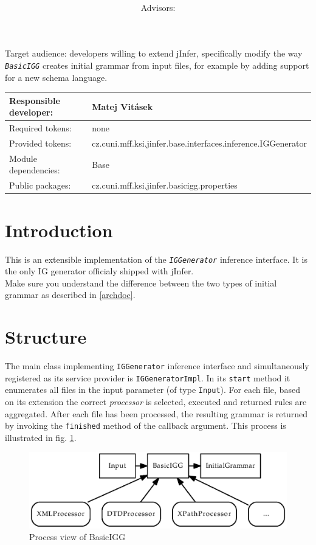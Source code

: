 \documentclass[a4paper,10pt,oneside]{article}
\title{\bf\mftitle}
\author{\mfauthor \\ Advisors: \mfadvisor}
\date{\mfplacedate}
\newcommand{\myscale}{0.74}
\newcommand{\code}[1]{\texttt{#1}}
\newcommand{\jmodule}[1]{\texttt{\textit{#1}}}
\begin{document}
\maketitle
\noindent Target audience: developers willing to extend jInfer, specifically modify the way \jmodule{BasicIGG} creates initial grammar from input files, for example by adding support for a new schema language.

\noindent \begin{tabular}{|l|l|} \hline
Responsible developer: & Matej Vitásek \\ \hline
Required tokens:       & none \\ \hline
Provided tokens:       & cz.cuni.mff.ksi.jinfer.base.interfaces.inference.IGGenerator \\ \hline
Module dependencies:   & Base \\ \hline
Public packages:       & cz.cuni.mff.ksi.jinfer.basicigg.properties \\ \hline
\end{tabular}

\section{Introduction}

This is an extensible implementation of the \jmodule{IGGenerator} inference interface. It is the only IG generator officialy shipped with jInfer.\\
Make sure you understand the difference between the two types of initial grammar as described in \ref{archdoc}.

\section{Structure}

The main class implementing \code{IGGenerator} inference interface and simultaneously registered as its service provider is \code{IGGeneratorImpl}. In its \code{start} method it enumerates all files in the input parameter (of type \code{Input}). For each file, based on its extension the correct \emph{processor} is selected, executed and returned rules are aggregated. After each file has been processed, the resulting grammar is returned by invoking the \code{finished} method of the callback argument. This process is illustrated in fig. \ref{figure-process}.

\begin{figure}
	\centering\includegraphics[scale=\myscale]{process-view}
	\caption{Process view of BasicIGG} \label{figure-process}
\end{figure}
\end{document}
